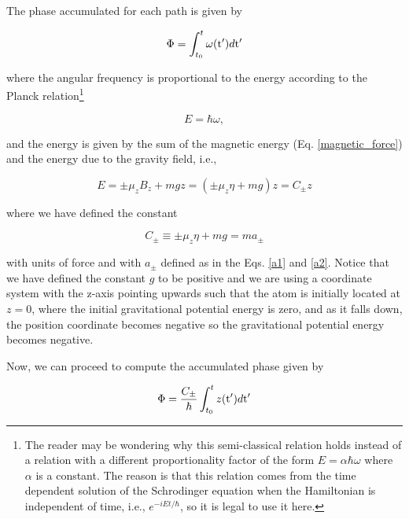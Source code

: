 \documentclass{article}
\begin{document}
The phase accumulated for each path is given by

\begin{equation}
\Phi = \int_{t_{0}}^{t} \omega(\ce{^{}_{}t{'}_{}})d\ce{^{}_{}t{'}_{}}
\end{equation}

where the angular frequency is proportional to the energy according to the Planck relation\footnote{The reader may be wondering why this semi-classical relation holds instead of a relation with a different proportionality factor of the form $E = \alpha \hbar \omega$ where $\alpha$ is a constant. The reason is that this relation comes from the time dependent solution of the Schrodinger equation when the Hamiltonian is independent of time, i.e., $e^{-i E t/\hbar}$, so it is legal to use it here.}

\begin{equation}\label{planck_relation}
E = \hbar \omega, 
\end{equation}

and the energy is given by the sum of the magnetic energy (Eq. \ref{magnetic_force}) and the energy due to the gravity field, i.e.,

\begin{equation}\label{classic_energy}
E = \pm \mu_{z} B_{z} + mgz = (\pm \mu_{z} \eta + mg)z = C_{\pm} z
\end{equation}

where we have defined the constant

\begin{equation}\label{c_definition}
C_{\pm} \equiv \pm \mu_{z} \eta + mg = m a_{\pm}
\end{equation}

with units of force and with $a_{\pm}$ defined as in the Eqs. \ref{a1} and \ref{a2}. Notice that we have defined the constant $g$ to be positive and we are using a coordinate system with the z-axis pointing upwards such that the atom is initially located at $z=0$, where the initial gravitational potential energy is zero, and as it falls down, the position coordinate becomes negative so the gravitational potential energy becomes negative.

Now, we can proceed to compute the accumulated phase given by

\begin{equation}\label{semi_classical_phase}
\Phi = \frac{C_{\pm}}{\hbar} \int_{t_{0}}^{t} z(\ce{^{}_{}t{'}_{}})d\ce{^{}_{}t{'}_{}}
\end{equation}
\end{document}
